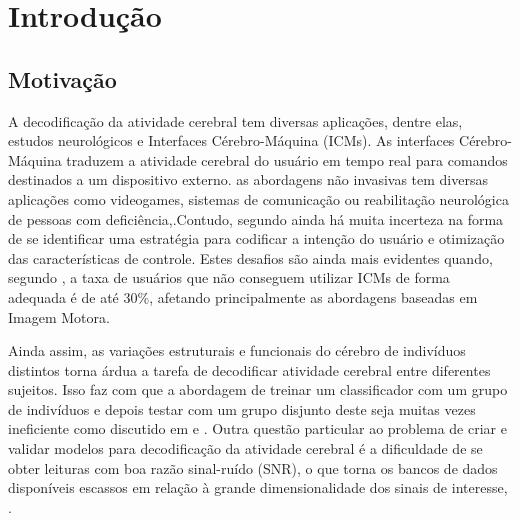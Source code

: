 \chapter{Introdução}



%

\section{Motivação}
A decodificação da atividade cerebral tem diversas aplicações, dentre elas, estudos neurológicos e Interfaces Cérebro-Máquina (ICMs).
As interfaces Cérebro-Máquina traduzem a atividade cerebral do usuário em tempo real para comandos destinados a um dispositivo externo. as abordagens não invasivas tem diversas aplicações como videogames, sistemas de comunicação ou reabilitação neurológica de pessoas com deficiência,\cite{halme2018across}.Contudo, segundo \cite{corsi2019integrating} ainda há muita incerteza na forma de se identificar uma estratégia para codificar a intenção do usuário e otimização das características de controle. Estes desafios são ainda mais evidentes quando, segundo \cite{vidaurre2010towards}, a taxa de usuários que não conseguem utilizar ICMs de forma adequada é de até 30\%, afetando principalmente as abordagens baseadas em Imagem Motora.


Ainda assim, as variações estruturais e funcionais do cérebro de indivíduos distintos torna árdua a tarefa de decodificar atividade cerebral entre diferentes sujeitos. Isso faz com que a abordagem de treinar um classificador com um grupo de indivíduos e depois testar com um grupo disjunto deste seja muitas vezes ineficiente como discutido em \cite{olivetti2014meg} e  \cite{Barachant}. Outra questão particular ao problema de criar e validar modelos para decodificação da atividade cerebral é a dificuldade de se obter leituras com boa razão sinal-ruído (SNR), o que torna os bancos de dados disponíveis escassos em relação à grande dimensionalidade dos sinais de interesse, \cite{varoquaux2017assessing}.

